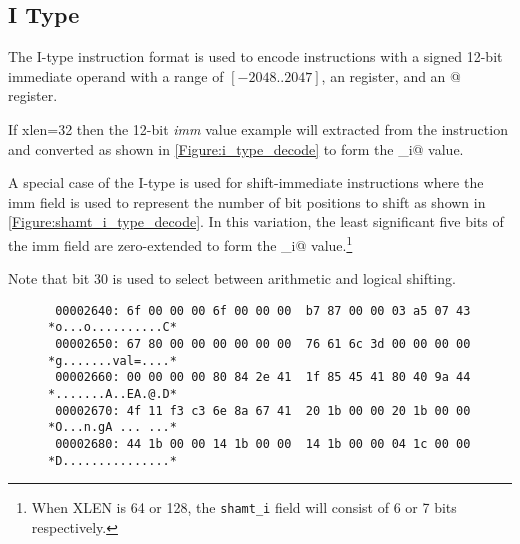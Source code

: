 


\subsection{I Type}
\label{insnformat:itype}

The I-type instruction format is used to encode instructions with a
signed 12-bit immediate operand with a range of $[-2048..2047]$,
an \verb@rd@ register, and an @ register.

If \Gls{xlen}=32 then the 12-bit {\em imm} value example will extracted from 
the instruction and converted as shown in \autoref{Figure:i_type_decode}
to form the \verb@imm_i@ value.

\begin{figure}[ht]
\centering
\DrawInsnOpITypeDecoding
{}
\label{Figure:i_type_decode}
\label{imm.i:decode}
\end{figure}

A special case of the I-type is used for shift-immediate instructions 
where the imm field is used to represent the number of bit positions 
to shift as shown in \autoref{Figure:shamt_i_type_decode}.
In this variation, the least significant five bits of the imm field are 
zero-extended to form the \verb@shamt_i@ 
value.\footnote{When XLEN is 64 or 128, the {\tt shamt\_i} field will 
consist of 6 or 7 bits respectively.}

\begin{figure}[ht]
\centering
\DrawInsnOpIShiftTypeDecoding
{}
\label{Figure:shamt_i_type_decode}
\label{shamt.i:decode}
\end{figure}

Note that bit 30 is used to select between arithmetic and logical shifting.

\begin{figure}[ht]
\centering
\begin{verbatim}
 00002640: 6f 00 00 00 6f 00 00 00  b7 87 00 00 03 a5 07 43 *o...o..........C*
 00002650: 67 80 00 00 00 00 00 00  76 61 6c 3d 00 00 00 00 *g.......val=....*
 00002660: 00 00 00 00 80 84 2e 41  1f 85 45 41 80 40 9a 44 *.......A..EA.@.D*
 00002670: 4f 11 f3 c3 6e 8a 67 41  20 1b 00 00 20 1b 00 00 *O...n.gA ... ...*
 00002680: 44 1b 00 00 14 1b 00 00  14 1b 00 00 04 1c 00 00 *D...............*
\end{verbatim}
\label{Figure:imm:memory:dump}
\end{figure}


